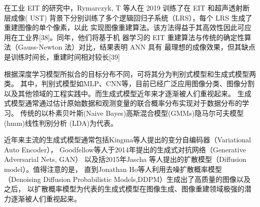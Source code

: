 在工业 EIT 的研究中，Rymarczyk, T 等人在 2019 训练了在 EIT 和超声透射断层成像( UST)
背景下分别训练了多个逻辑回归子系统（LRS），每个 LRS 生成了重建图像的单个像素，以此
实现图像重建算法。该方法得益于其高效性因此可应用在工业界[38]。同年，他们将基于机
器学习的 EIT 重建算法与传统的确定性算法（Gauss-Newton 法）对比，结果表明 ANN 具有
最理想的成像效果，但其缺点是训练时间长，重建时间相对较长[39]


根据深度学习模型所拟合的目标分布不同，可将其分为判别式模型和生成式模型两类。
其中，判别式模型如MLP、CNN等，目前已经广泛应用图像分类、图像分割以及其他领域的工程实践中。而生成式模型近年来才逐渐被人们重视起来。
生成式模型通常通过估计原始数据和观测变量的联合概率分布实现对于数据分布的学习。
传统的以朴素贝叶斯(Naive Bayes)高斯混合模型(GMMs)隐马尔可夫模型(hmm)线性判别分析 (LDA)为代表。

近年来主流的生成式模型通常包括Kingma等人提出的变分自编码器（Variational Auto Encoder）\cite{2013Auto}，
Goodfellow等人于2014年提出的生成式对抗网络\cite{2014Generative}（Generative Adversarial Nets, GAN）
以及括2015年Jascha 等人提出的扩散模型\cite{DiffusionModel}（Diffusion model）。值得注意的是，
直到Jonathan Ho等人利用去噪扩散概率模型\cite{DDPM}（Denoising Diffusion Probabilistic Models,DDPM）生成出了高质量的图像以及之后，
以扩散概率模型为代表的生成式模型在图像生成、图像重建领域极强的潜力逐渐被人们重视起来。

